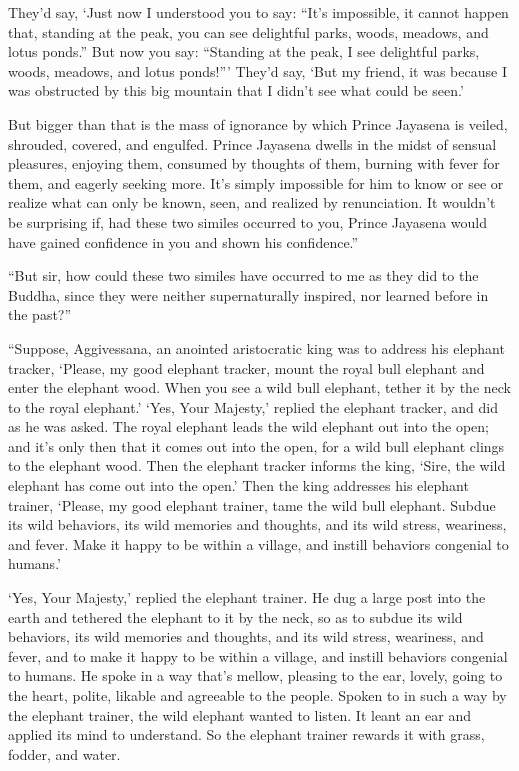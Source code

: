 \documentclass[12pt,openany]{book}%
\begin{document}
They’d say, ‘Just now I understood you to say: “It’s impossible, it cannot happen that, standing at the peak, you can see delightful parks, woods, meadows, and lotus ponds.” But now you say: “Standing at the peak, I see delightful parks, woods, meadows, and lotus ponds!”’ They’d say, ‘But my friend, it was because I was obstructed by this big mountain that I didn’t see what could be seen.’ 

But bigger than that is the mass of ignorance by which Prince Jayasena is veiled, shrouded, covered, and engulfed. Prince Jayasena dwells in the midst of sensual pleasures, enjoying them, consumed by thoughts of them, burning with fever for them, and eagerly seeking more. It’s simply impossible for him to know or see or realize what can only be known, seen, and realized by renunciation. It wouldn’t be surprising if, had these two similes occurred to you, Prince Jayasena would have gained confidence in you and shown his confidence.” 

“But sir, how could these two similes have occurred to me as they did to the Buddha, since they were neither supernaturally inspired, nor learned before in the past?” 

“Suppose, Aggivessana, an anointed aristocratic king was to address his elephant tracker, ‘Please, my good elephant tracker, mount the royal bull elephant and enter the elephant wood. When you see a wild bull elephant, tether it by the neck to the royal elephant.’ ‘Yes, Your Majesty,’ replied the elephant tracker, and did as he was asked. The royal elephant leads the wild elephant out into the open; and it’s only then that it comes out into the open, for a wild bull elephant clings to the elephant wood. Then the elephant tracker informs the king, ‘Sire, the wild elephant has come out into the open.’ Then the king addresses his elephant trainer, ‘Please, my good elephant trainer, tame the wild bull elephant. Subdue its wild behaviors, its wild memories and thoughts, and its wild stress, weariness, and fever. Make it happy to be within a village, and instill behaviors congenial to humans.’ 

‘Yes, Your Majesty,’ replied the elephant trainer. He dug a large post into the earth and tethered the elephant to it by the neck, so as to subdue its wild behaviors, its wild memories and thoughts, and its wild stress, weariness, and fever, and to make it happy to be within a village, and instill behaviors congenial to humans. He spoke in a way that’s mellow, pleasing to the ear, lovely, going to the heart, polite, likable and agreeable to the people. Spoken to in such a way by the elephant trainer, the wild elephant wanted to listen. It leant an ear and applied its mind to understand. So the elephant trainer rewards it with grass, fodder, and water. 
\end{document}
